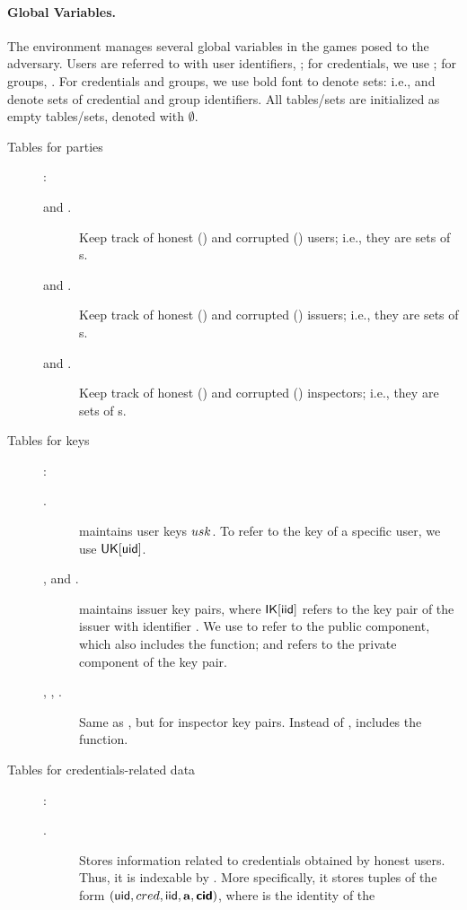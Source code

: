\paragraph{Global Variables.} %
The environment manages several global variables in the games posed to the
adversary. Users are referred to with user identifiers, \uid; for credentials,
we use \cid; for groups, \gid. For credentials and groups, we use bold font to
denote sets: i.e., \scid and \sgid denote sets of credential and group
identifiers. All tables/sets are initialized as empty tables/sets, denoted
with $\emptyset$.

\begin{description}
\item[Tables for parties]:
  \begin{description}
  \item[\HU and \CU.] Keep track of honest (\HU) and corrupted (\CU) users;
    i.e., they are sets of {\uid}s.
  \item[\HI and \CI.] Keep track of honest (\HI) and corrupted (\CI) issuers;
    i.e., they are sets of {\iid}s.
  \item[\HO and \CO.] Keep track of honest (\HO) and corrupted (\CO) inspectors;
    i.e., they are sets of {\oid}s.
  \end{description}
\item[Tables for keys]:
  \begin{description}
  \item[\UK.] \UK maintains user keys $usk$. To refer to the key of a specific
    user, we use $\mathsf{UK}[\mathsf{uid}]$. 
  \item[\IK, \PUBIK and \PRVIK.] \IK maintains issuer key pairs, where
    $\mathsf{IK}[\mathsf{iid}]$ refers to the key pair of the issuer with identifier \iid. We
    use \PUBIK to refer to the public component, which also includes the \fissue
    function; and \PRVIK refers to the private component of the key pair.
  \item[\OK, \PUBOK, \PRVOK.] Same as \IK, but for inspector key pairs. Instead
    of \fissue, \OK includes the \finsp function.
  \end{description}
\item[Tables for credentials-related data]:
  \begin{description}
  \item[\CRED.] Stores information related to credentials obtained by honest
    users. Thus, it is indexable by \cid. More specifically, it stores tuples of
    the form $(\mathsf{uid},cred,\mathsf{iid},\mathbf{a},\boldsymbol{\mathsf{cid}})$, where \uid is the identity of the

\end{description}
\end{description}
